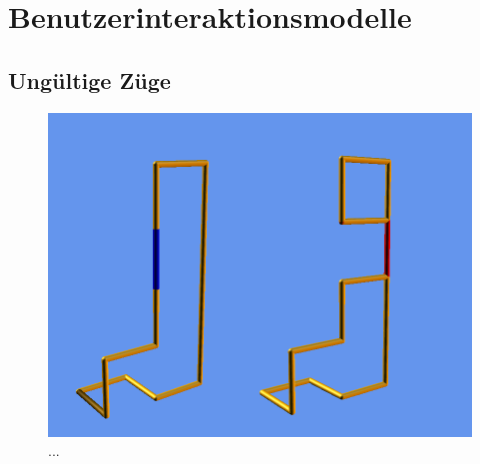 	
\clearpage


\section{Benutzerinteraktionsmodelle}

	\begin{figure}[ht]
	  \centering
	  
	\end{figure}
	
%		  
	
%		  
	
	
%		  
	
\clearpage
	
\subsection{Ungültige Züge}

	\begin{figure}[htb]
	  \centering
	  \includegraphics[width = \textwidth]{Systemmodelle/Ungueltiger_Zug.png}
	  \caption{...}
	  \label{fig:zug1}
	\end{figure}

